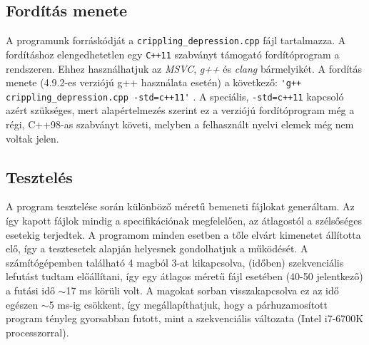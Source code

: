 \documentclass[12pt]{article}
\begin{document}
\subsection{Fordítás menete}
A programunk forráskódját a \verb|crippling_depression.cpp| fájl tartalmazza. A fordításhoz
elengedhetetlen egy \verb|C++11| szabványt támogató fordítóprogram a rendszeren. Ehhez
használhatjuk az \textit{MSVC}, \textit{g++} és \textit{clang} bármelyikét. A fordítás menete
(4.9.2-es verziójú g++ használata esetén) a következő: \verb|'g++ crippling_depression.cpp -std=c++11'|
. A speciális, \verb|-std=c++11| kapcsoló azért szükséges, mert alapértelmezés
szerint ez a verziójú fordítóprogram még a régi, C++98-as szabványt követi, melyben a
felhasznált nyelvi elemek még nem voltak jelen.

\subsection{Tesztelés}
A program tesztelése során különböző méretű bemeneti fájlokat generáltam. Az így kapott
fájlok mindig a specifikációnak megfelelően, az átlagostól a szélsőséges esetekig terjedtek.
A programom minden esetben a tőle elvárt kimenetet állította elő, így a tesztesetek alapján
helyesnek gondolhatjuk a működését.\br
A számítógépemben található 4 magból 3-at kikapcsolva, (időben) szekvenciális lefutást tudtam 
előállítani, így egy átlagos méretű fájl esetében (40-50 jelentkező) a futási idő $\sim$17 ms
körüli volt. A magokat sorban visszakapcsolva ez az idő egészen $\sim$5 ms-ig csökkent,
így megállapíthatjuk, hogy a párhuzamosított program tényleg gyorsabban futott, mint a
szekvenciális változata (Intel i7-6700K processzorral).
\end{document}
